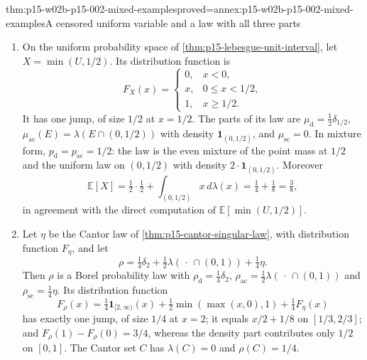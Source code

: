 \begin{hbtheorem}{thm:p15-w02b-p15-002-mixed-examples}{proved=annex:p15-w02b-p15-002-mixed-examples}{A censored uniform variable and a law with all three parts}
\begin{enumerate}
\item On the uniform probability space of
      \cref{thm:p15-lebesgue-unit-interval}, let \(X=\min(U,1/2)\).
      Its distribution function is
      \[
       F_X(x)=
       \begin{cases}
       0,&x<0,\\
       x,&0\leq x<1/2,\\
       1,&x\geq1/2.
       \end{cases}
      \]
      It has one jump, of size \(1/2\) at \(x=1/2\). The parts of its law
      are \(\mu_{\mathrm d}=\tfrac12\delta_{1/2}\),
      \(\mu_{\mathrm{ac}}(E)=\lambda(E\cap(0,1/2))\) with density
      \(\mathbf1_{(0,1/2)}\), and \(\mu_{\mathrm{sc}}=0\). In mixture form,
      \(p_{\mathrm d}=p_{\mathrm{ac}}=1/2\): the law is the even mixture of
      the point mass at \(1/2\) and the uniform law on \((0,1/2)\) with
      density \(2\cdot\mathbf1_{(0,1/2)}\). Moreover
      \[
       \mathbb E[X]=\tfrac12\cdot\tfrac12+\int_{(0,1/2)}x\,d\lambda(x)
                   =\tfrac14+\tfrac18=\tfrac38,
      \]
      in agreement with the direct computation of
      \(\mathbb E[\min(U,1/2)]\).
\item Let \(\eta\) be the Cantor law of
      \cref{thm:p15-cantor-singular-law}, with distribution function
      \(F_\eta\), and let
      \[
       \rho=\tfrac14\delta_2+\tfrac12\lambda(\,\cdot\,\cap(0,1))
             +\tfrac14\eta .
      \]
      Then \(\rho\) is a Borel probability law with
      \(\rho_{\mathrm d}=\tfrac14\delta_2\),
      \(\rho_{\mathrm{ac}}=\tfrac12\lambda(\,\cdot\,\cap(0,1))\) and
      \(\rho_{\mathrm{sc}}=\tfrac14\eta\). Its distribution function
      \[
       F_\rho(x)=\tfrac14\mathbf1_{[2,\infty)}(x)
                 +\tfrac12\min(\max(x,0),1)+\tfrac14F_\eta(x)
      \]
      has exactly one jump, of size \(1/4\) at \(x=2\); it equals
      \(x/2+1/8\) on \([1/3,2/3]\); and \(F_\rho(1)-F_\rho(0)=3/4\),
      whereas the density part contributes only \(1/2\) on \([0,1]\).
      The Cantor set \(C\) has \(\lambda(C)=0\) and \(\rho(C)=1/4\).
\end{enumerate}
\end{hbtheorem}

